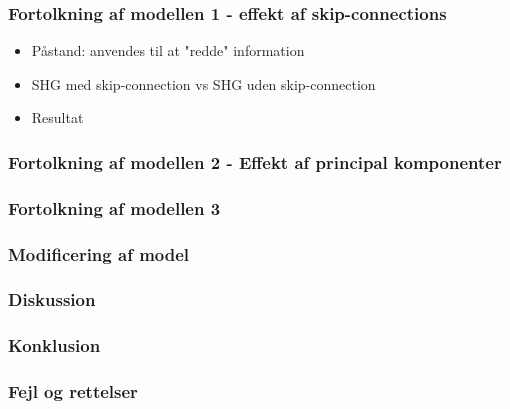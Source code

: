 \documentclass{beamer}
\begin{document}
\begin{frame}
    \frametitle{Fortolkning af modellen 1 - effekt af skip-connections}
    \begin{itemize}
        \item<2-> Påstand: anvendes til at "redde" information
        \item<3-> SHG med skip-connection vs SHG uden skip-connection
        \item<4-> Resultat
    \end{itemize}
    \begin{minipage}{\textwidth}
    \end{minipage}
\end{frame}

\begin{frame}
    \frametitle{Fortolkning af modellen 2 - Effekt af principal komponenter}
\end{frame}

\begin{frame}
    \frametitle{Fortolkning af modellen 3}
\end{frame}

\begin{frame}
    \frametitle{Modificering af model}
\end{frame}

\begin{frame}
    \frametitle{Diskussion}
\end{frame}

\begin{frame}
    \frametitle{Konklusion}
\end{frame}

\begin{frame}
    \frametitle{Fejl og rettelser}
\end{frame}
\end{document}

